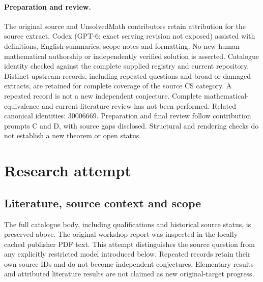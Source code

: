 \documentclass[11pt]{article}
\begin{document}
\paragraph{Preparation and review.}
The original source and UnsolvedMath contributors retain attribution for the source extract. Codex (GPT-6; exact serving revision not exposed) assisted with definitions, English summaries, scope notes and formatting. No new human mathematical authorship or independently verified solution is asserted. Catalogue identity checked against the complete supplied registry and current repository. Distinct upstream records, including repeated questions and broad or damaged extracts, are retained for complete coverage of the source CS category. A repeated record is not a new independent conjecture. Complete mathematical-equivalence and current-literature review has not been performed. Related canonical identities: 30006669. Preparation and final review follow contribution prompts C and D, with source gaps disclosed. Structural and rendering checks do not establish a new theorem or open status.
\label{end:statement}

\section{Research attempt}
\subsection{Literature, source context and scope}
The full catalogue body, including qualifications and historical source status, is preserved above. The original workshop report was inspected in the locally cached publisher PDF text. This attempt distinguishes the source question from any explicitly restricted model introduced below. Repeated records retain their own source IDs and do not become independent conjectures. Elementary results and attributed literature results are not claimed as new original-target progress.
\end{document}

